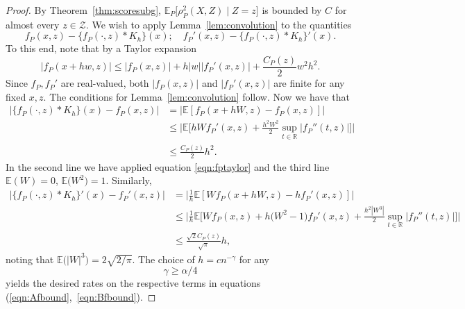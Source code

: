 \documentclass[aos]{imsart}
\newcommand{\R}{\mathbb{R}}
\newcommand{\E}{\mathbb{E}}
\begin{document}
\begin{proof}
		By Theorem~\ref{thm:scoresubg}, $\E_P\big[\rho^2_P(X,Z) \; \big|\; Z=z\big]$ is bounded by $C$ for almost every $z\in\mathcal{Z}$. We wish to apply Lemma~\ref{lem:convolution} to the quantities \begin{equation*}
			f_P(x,z)-\{f_P(\cdot,z)*K_h\}(x); \quad f_P'(x,z)-\{f_P(\cdot,z)*K_h\}'(x).
		\end{equation*}
		To this end, note that by a Taylor expansion
		\begin{equation}
			|f_P(x+hw,z)| \leq |f_P(x,z)| + h|w||f_P'(x,z)|+\frac{C_P(z)}{2}w^2 h^2. \label{eqn:fptaylor}
		\end{equation}
		Since $f_P,f_P'$ are real-valued, both $|f_P(x,z)|$ and $|f_P'(x,z)|$ are finite for any fixed $x,z$. The conditions for Lemma~\ref{lem:convolution} follow. Now we have that
		\begin{align*}
			\big|\{f_P(\cdot,z)*K_h\}(x) - f_P(x,z)\big|&= \big|\E[f_P(x+hW,z) - f_P(x,z)]\big|\\
			&\leq  \bigg|\E\bigg[ hW f_P'(x,z) + \frac{h^2W^2}{2} \sup_{t\in\R} \big| f_P''(t,z)\big|\bigg]\bigg|\\
			&\leq \frac{C_P(z)}{2}h^2. 
		\end{align*}
		In the second line we have applied equation \eqref{eqn:fptaylor} and the third line $\E(W)=0$, $\E\big(W^2\big)=1$.
		Similarly, 
		\begin{align*}
			\big| \{f_P(\cdot,z)*K_h\}'(x) -  f_P'(x,z)\big|&= \bigg|\frac1h \E[Wf_P(x+hW,z) - h f_P'(x,z)]\bigg|\\
			&\leq  \bigg|\frac1h\E\bigg[ W f_P(x,z) + h\big(W^2-1\big)  f_P'(x,z) + \frac{h^2|W^3|}{2} \sup_{t\in\R} \big| f_P''(t,z)\big|\bigg]\bigg|\\
			&\leq \frac{\sqrt{2}C_P(z)}{\sqrt{\pi}}h, 
		\end{align*}
		noting that $\E\big(|W|^3\big)=2\sqrt{2/\pi}$.
		The choice of $h = cn^{-\gamma}$ for any \begin{equation}
			\gamma \geq \alpha/4 \label{eqn:gammaalpha4}
		\end{equation} yields the desired rates on the respective terms in equations (\ref{eqn:Afbound},~\ref{eqn:Bfbound}). 
		

\end{proof}
\end{document}
